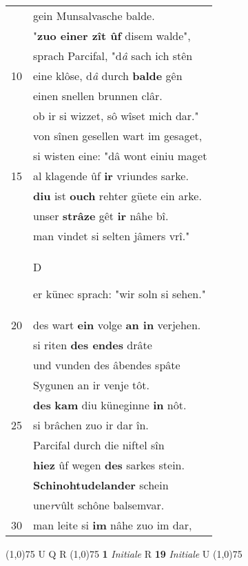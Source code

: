\documentclass[8pt,a4paper,notitlepage]{article}
\begin{document}
\begin{table}[ht]
\begin{minipage}[t]{0.5\linewidth}
\begin{tabular}{rl}
 & gein Munsalvasche balde.\\ 
 & "\textbf{zuo einer zît ûf} disem walde",\\ 
 & sprach Parcifal, "d\textit{â} sach ich stên\\ 
10 & eine klôse, d\textit{â} durch \textbf{balde} gên\\ 
 & einen snellen brunnen clâr.\\ 
 & ob ir si wizzet, sô wîset mich dar."\\ 
 & von sînen gesellen wart im gesaget,\\ 
 & si wisten eine: "dâ wont einiu maget\\ 
15 & al klagende ûf \textbf{ir} vriundes sarke.\\ 
 & \textbf{diu} ist \textbf{ouch} rehter güete ein arke.\\ 
 & unser \textbf{strâze} gêt \textbf{ir} nâhe bî.\\ 
 & man vindet si selten jâmers vrî."\\ 
 & \begin{large}D\end{large}er künec sprach: "wir soln si sehen."\\ 
20 & des wart \textbf{ein} volge \textbf{an in} verjehen.\\ 
 & si riten \textbf{des endes} drâte\\ 
 & und vunden des âbendes spâte\\ 
 & Sygunen an ir venje tôt.\\ 
 & \textbf{des} \textbf{kam} diu küneginne \textbf{in} nôt.\\ 
25 & si brâchen zuo ir dar în.\\ 
 & Parcifal durch die niftel sîn\\ 
 & \textbf{hiez} ûf wegen \textbf{des} sarkes stein.\\ 
 & \textbf{Schinohtudelander} schein\\ 
 & une\textit{r}vûlt schône balsemvar.\\ 
30 & man leite si \textbf{im} nâhe zuo im dar,\\ 
\end{tabular}
\scriptsize
\line(1,0){75} \newline
U Q R \newline
\line(1,0){75} \newline
\textbf{1} \textit{Initiale} R  \textbf{19} \textit{Initiale} U  \newline
\line(1,0){75} \newline

\end{minipage}
\end{table}
\end{document}
